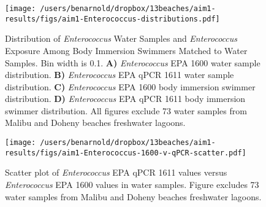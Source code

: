 \documentclass[11pt]{article}
\begin{document}
\clearpage
\begin{figure}[htbp]
\begin{center}
\texttt{[image: /users/benarnold/dropbox/13beaches/aim1-results/figs/aim1-Enterococcus-distributions.pdf]}
\begin{minipage}{\textwidth}
\caption{Distribution of \textit{Enterococcus} Water Samples and \textit{Enterococcus} Exposure Among Body Immersion Swimmers Matched to Water Samples. Bin width is 0.1.  \textbf{A)} \textit{Enterococcus} EPA 1600 water sample distribution. \textbf{B)} \textit{Enterococcus} EPA qPCR 1611 water sample distribution. \textbf{C)} \textit{Enterococcus} EPA 1600 body immersion swimmer distribution. \textbf{D)} \textit{Enterococcus} EPA qPCR 1611 body immersion swimmer distribution. All figures exclude 73 water samples from Malibu and Doheny beaches freshwater lagoons.}
\label{fig:enterodist}
\end{minipage}
\end{center}
\end{figure}


\clearpage
\begin{figure}[htbp]
\begin{center}
\texttt{[image: /users/benarnold/dropbox/13beaches/aim1-results/figs/aim1-Enterococcus-1600-v-qPCR-scatter.pdf]}
\begin{minipage}{\textwidth}
\caption{Scatter plot of \textit{Enterococcus} EPA qPCR 1611 values versus \textit{Enterococcus} EPA 1600 values in water samples.  Figure excludes 73 water samples from Malibu and Doheny beaches freshwater lagoons.}
\label{fig:enteroscat}
\end{minipage}
\end{center}
\end{figure}
\end{document}
